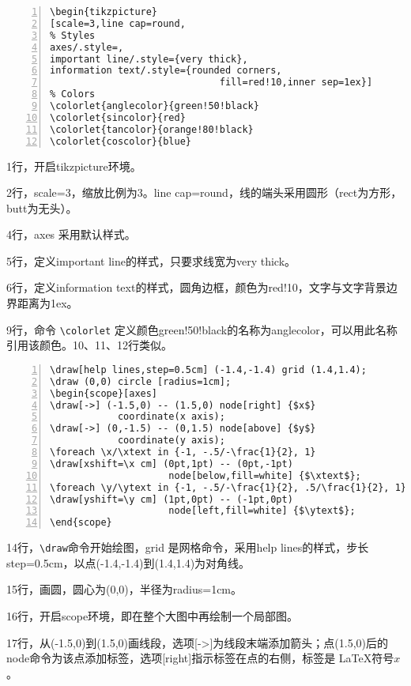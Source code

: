 \documentclass[UTF8]{ctexart}
\begin{document}
\begin{lstlisting}[name=example-1,numbers=left,    numberstyle=\footnotesize]
\begin{tikzpicture}
[scale=3,line cap=round,
% Styles
axes/.style=,
important line/.style={very thick},
information text/.style={rounded corners,
                              fill=red!10,inner sep=1ex}]
% Colors
\colorlet{anglecolor}{green!50!black}
\colorlet{sincolor}{red}
\colorlet{tancolor}{orange!80!black}
\colorlet{coscolor}{blue}
\end{lstlisting}

1行，开启tikzpicture环境。

2行，scale=3，缩放比例为3。line cap=round，线的端头采用圆形（rect为方形，butt为无头）。

4行，axes 采用默认样式。

5行，定义important line的样式，只要求线宽为very thick。

6行，定义information text的样式，圆角边框，颜色为red!10，文字与文字背景边界距离为1ex。

9行，命令 \verb!\colorlet! 定义颜色green!50!black的名称为anglecolor，可以用此名称引用该颜色。10、11、12行类似。

\begin{lstlisting}[name=example-1,numbers=left,    numberstyle=\footnotesize]
% The graphic
\draw[help lines,step=0.5cm] (-1.4,-1.4) grid (1.4,1.4);
\draw (0,0) circle [radius=1cm];
\begin{scope}[axes]
\draw[->] (-1.5,0) -- (1.5,0) node[right] {$x$} 
            coordinate(x axis);
\draw[->] (0,-1.5) -- (0,1.5) node[above] {$y$} 
            coordinate(y axis);
\foreach \x/\xtext in {-1, -.5/-\frac{1}{2}, 1}
\draw[xshift=\x cm] (0pt,1pt) -- (0pt,-1pt) 
                     node[below,fill=white] {$\xtext$};
\foreach \y/\ytext in {-1, -.5/-\frac{1}{2}, .5/\frac{1}{2}, 1}
\draw[yshift=\y cm] (1pt,0pt) -- (-1pt,0pt) 
                     node[left,fill=white] {$\ytext$};
\end{scope}
\end{lstlisting}

14行，\verb!\draw!命令开始绘图，grid 是网格命令，采用help lines的样式，步长step=0.5cm，以点(-1.4,-1.4)到(1.4,1.4)为对角线。

15行，画圆，圆心为(0,0)，半径为radius=1cm。

16行，开启scope环境，即在整个大图中再绘制一个局部图。

17行，从(-1.5,0)到(1.5,0)画线段，选项[->]为线段末端添加箭头；点(1.5,0)后的node命令为该点添加标签，选项[right]指示标签在点的右侧，标签是 \LaTeX 符号$x$。
\end{document}

